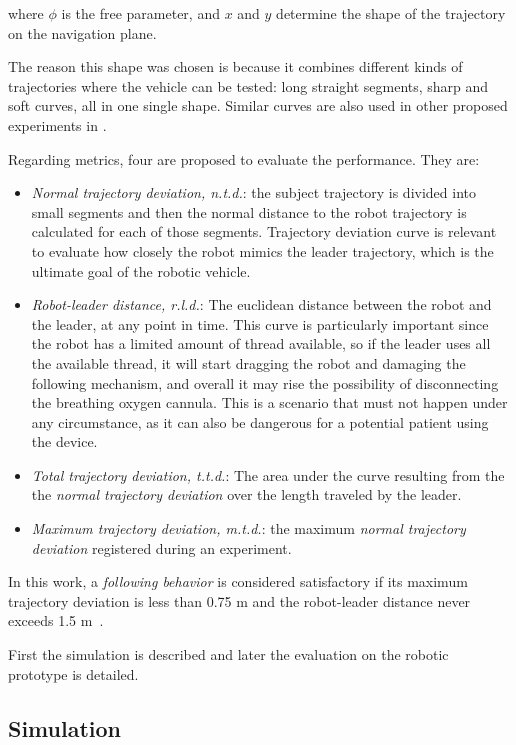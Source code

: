 \documentclass[journal]{IEEEtran}
\begin{document}
\noindent where $ \phi $ is the free parameter, and $x$ and $y$ determine the shape of the trajectory on the navigation plane.

The reason  this shape was chosen is because it combines different kinds of trajectories where the vehicle can be tested: long straight segments, sharp and soft curves, all in one single shape. Similar curves are also used in other proposed experiments in \cite{Neto2015,Endo2015}.  

Regarding metrics, four are proposed to evaluate the performance.  They are:

\begin{itemize}
    \item \textit{Normal trajectory deviation, n.t.d.}: the subject trajectory is divided into small segments and then the normal distance to the robot trajectory is calculated for each of those segments. Trajectory deviation curve is relevant to evaluate how closely the robot mimics the leader trajectory, which is the ultimate goal of the robotic vehicle. 
    \item \textit{Robot-leader distance, r.l.d.}: The euclidean distance between the robot and the leader, at any point in time. This curve is particularly important since the robot has a limited amount of thread available, so if the leader uses all the available thread, it will start dragging the robot and damaging the following mechanism, and overall it may rise the possibility of disconnecting the breathing oxygen cannula. This is a scenario that must not happen under any circumstance, as it can also be dangerous for a potential patient using the device. 
    \item \textit{Total trajectory deviation, t.t.d.}: The area under the curve resulting from the the \textit{normal trajectory deviation} over the length traveled by the leader.
    \item \textit{Maximum trajectory deviation, m.t.d.}: the maximum \textit{normal trajectory deviation} registered during an experiment.    
\end{itemize}{}

In this work, a \textit{following behavior} is considered satisfactory if its maximum trajectory deviation is less than 0.75 m and the robot-leader distance never exceeds 1.5 m~\cite{MunozCeballos2010}.

First the simulation is described and later the evaluation on the robotic prototype is detailed.

\subsection{Simulation}
\end{document}

